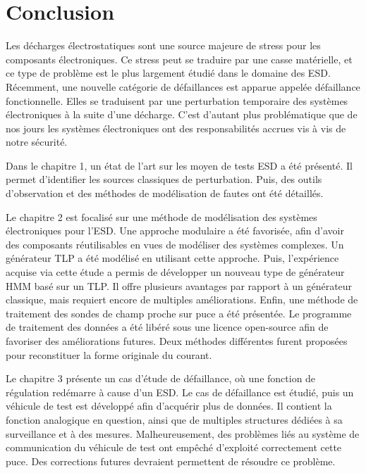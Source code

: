 \chapter{Conclusion}

Les décharges électrostatiques sont une source majeure de stress pour les composants électroniques.
Ce stress peut se traduire par une casse matérielle, et ce type de problème est le plus largement étudié dans le domaine des ESD.
Récemment, une nouvelle catégorie de défaillances est apparue appelée défaillance fonctionnelle.
Elles se traduisent par une perturbation temporaire des systèmes électroniques à la suite d'une décharge.
C'est d'autant plus problématique que de nos jours les systèmes électroniques ont des responsabilités accrues vis à vis de notre sécurité.

Dans le chapitre 1, un état de l'art sur les moyen de tests ESD a été présenté.
Il permet d'identifier les sources classiques de perturbation.
Puis, des outils d'observation et des méthodes de modélisation de fautes ont été détaillés.

Le chapitre 2 est focalisé sur une méthode de modélisation des systèmes électroniques pour l'ESD.
Une approche modulaire a été favorisée, afin d'avoir des composants réutilisables en vues de modéliser des systèmes complexes.
Un générateur TLP a été modélisé en utilisant cette approche.
Puis, l'expérience acquise via cette étude a permis de développer un nouveau type de générateur HMM basé sur un TLP.
Il offre plusieurs avantages par rapport à un générateur classique, mais requiert encore de multiples améliorations.
Enfin, une méthode de traitement des sondes de champ proche sur puce a été présentée.
Le programme de traitement des données a été libéré \cite{} sous une licence open-source afin de favoriser des améliorations futures.
Deux méthodes différentes furent proposées pour reconstituer la forme originale du courant.

Le chapitre 3 présente un cas d'étude de défaillance, où une fonction de régulation redémarre à cause d'un ESD.
Le cas de défaillance est étudié, puis un véhicule de test est développé afin d'acquérir plus de données.
Il contient la fonction analogique en question, ainsi que de multiples structures dédiées à sa surveillance et à des mesures.
Malheureusement, des problèmes liés au système de communication du véhicule de test ont empêché d'exploité correctement cette puce.
Des corrections futures devraient permettent de résoudre ce problème.

